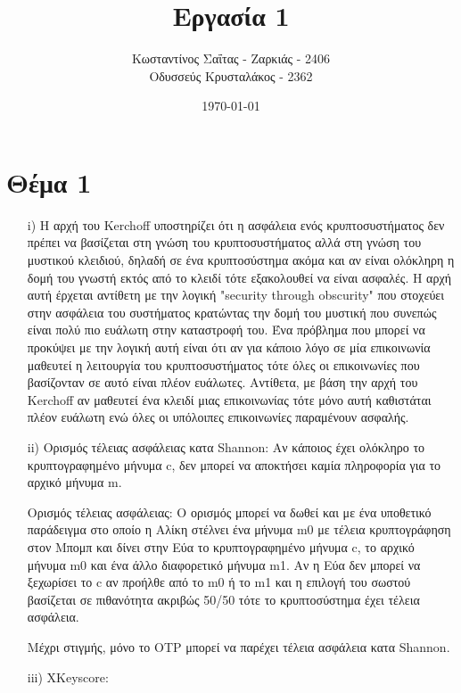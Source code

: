 \documentclass[a4paper, 11pt]{article}
\title{Εργασία 1}
\author{Κωσταντίνος Σαΐτας - Ζαρκιάς - 2406 \\ Οδυσσεύς Κρυσταλάκος - 2362}
\date{\today}
\newcommand{\lt}{\latintext}
\begin{document}
\maketitle

\section*{Θέμα 1}


\begin{itemize}
	\item[{\lt i)}] Η αρχή του {\lt Kerchoff} υποστηρίζει ότι η ασφάλεια ενός κρυπτοσυστήματος δεν πρέπει να βασίζεται στη γνώση του κρυπτοσυστήματος αλλά στη γνώση του μυστικού κλειδιού, δηλαδή σε ένα κρυπτοσύστημα ακόμα και αν είναι ολόκληρη η δομή του γνωστή εκτός από το κλειδί τότε εξακολουθεί να είναι ασφαλές. Η αρχή αυτή έρχεται αντίθετη με την λογική "{\lt security through obscurity}" που στοχεύει στην ασφάλεια του συστήματος κρατώντας την δομή του μυστική που συνεπώς είναι πολύ πιο ευάλωτη στην καταστροφή του. Ένα πρόβλημα που μπορεί να προκύψει με την λογική αυτή είναι ότι αν για κάποιο λόγο σε μία επικοινωνία μαθευτεί η λειτουργία του κρυπτοσυστήματος τότε όλες οι επικοινωνίες που βασίζονταν σε αυτό είναι πλέον ευάλωτες. Αντίθετα, με βάση την αρχή του {\lt Kerchoff} αν μαθευτεί ένα κλειδί μιας επικοινωνίας τότε μόνο αυτή καθιστάται πλέον ευάλωτη ενώ όλες οι υπόλοιπες επικοινωνίες παραμένουν ασφαλής. 
		
	
	
	\item[{\lt ii)}] Ορισμός τέλειας ασφάλειας κατα {\lt Shannon}: Αν κάποιος έχει ολόκληρο το κρυπτογραφημένο μήνυμα {\lt c}, δεν μπορεί να αποκτήσει καμία πληροφορία για το αρχικό μήνυμα {\lt m}.
	
					Ορισμός τέλειας ασφάλειας: Ο ορισμός μπορεί να δωθεί και με ένα υποθετικό παράδειγμα στο οποίο η Αλίκη στέλνει ένα μήνυμα {\lt m0} με τέλεια κρυπτογράφηση στον Μπομπ και δίνει στην Εύα το κρυπτογραφημένο μήνυμα {\lt c}, το αρχικό μήνυμα {\lt m0} και ένα άλλο διαφορετικό μήνυμα {\lt m1}. Αν η Εύα δεν μπορεί να ξεχωρίσει το {\lt c} αν προήλθε από το {\lt m0} ή το {\lt m1} και η επιλογή του σωστού βασίζεται σε πιθανότητα ακριβώς 50/50 τότε το κρυπτοσύστημα έχει τέλεια ασφάλεια.
	
	Μέχρι στιγμής, μόνο το {\lt OTP} μπορεί να παρέχει τέλεια ασφάλεια κατα {\lt Shannon}.
	
	
	
	
	
	\item[{\lt iii)}] {\lt XKeyscore}:  
	

\end{itemize}
\end{document}

